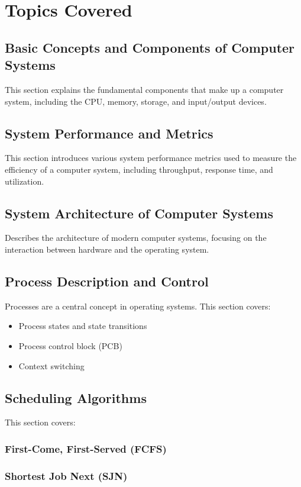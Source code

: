 \documentclass[12pt]{article}
\begin{document}
\section{Topics Covered}

\subsection{Basic Concepts and Components of Computer Systems}
This section explains the fundamental components that make up a computer system, including the CPU, memory, storage, and input/output devices.

\subsection{System Performance and Metrics}
This section introduces various system performance metrics used to measure the efficiency of a computer system, including throughput, response time, and utilization.

\subsection{System Architecture of Computer Systems}
Describes the architecture of modern computer systems, focusing on the interaction between hardware and the operating system.

\subsection{Process Description and Control}
Processes are a central concept in operating systems. This section covers:
\begin{itemize}
    \item Process states and state transitions
    \item Process control block (PCB)
    \item Context switching
\end{itemize}

\subsection{Scheduling Algorithms}
	This section covers:
	\subsubsection{First-Come, First-Served (FCFS)}
	\subsubsection{Shortest Job Next (SJN)}
\end{document}

